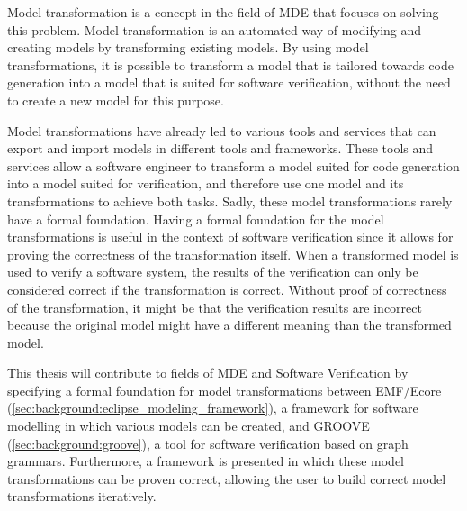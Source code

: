 Model transformation is a concept in the field of MDE that focuses on solving this problem. Model transformation is an automated way of modifying and creating models by transforming existing models. By using model transformations, it is possible to transform a model that is tailored towards code generation into a model that is suited for software verification, without the need to create a new model for this purpose.

Model transformations have already led to various tools and services that can export and import models in different tools and frameworks. These tools and services allow a software engineer to transform a model suited for code generation into a model suited for verification, and therefore use one model and its transformations to achieve both tasks. Sadly, these model transformations rarely have a formal foundation. Having a formal foundation for the model transformations is useful in the context of software verification since it allows for proving the correctness of the transformation itself. When a transformed model is used to verify a software system, the results of the verification can only be considered correct if the transformation is correct. Without proof of correctness of the transformation, it might be that the verification results are incorrect because the original model might have a different meaning than the transformed model.

This thesis will contribute to fields of MDE and Software Verification by specifying a formal foundation for model transformations between EMF/Ecore (\cref{sec:background:eclipse_modeling_framework}), a framework for software modelling in which various models can be created, and GROOVE (\cref{sec:background:groove}), a tool for software verification based on graph grammars. Furthermore, a framework is presented in which these model transformations can be proven correct, allowing the user to build correct model transformations iteratively.








